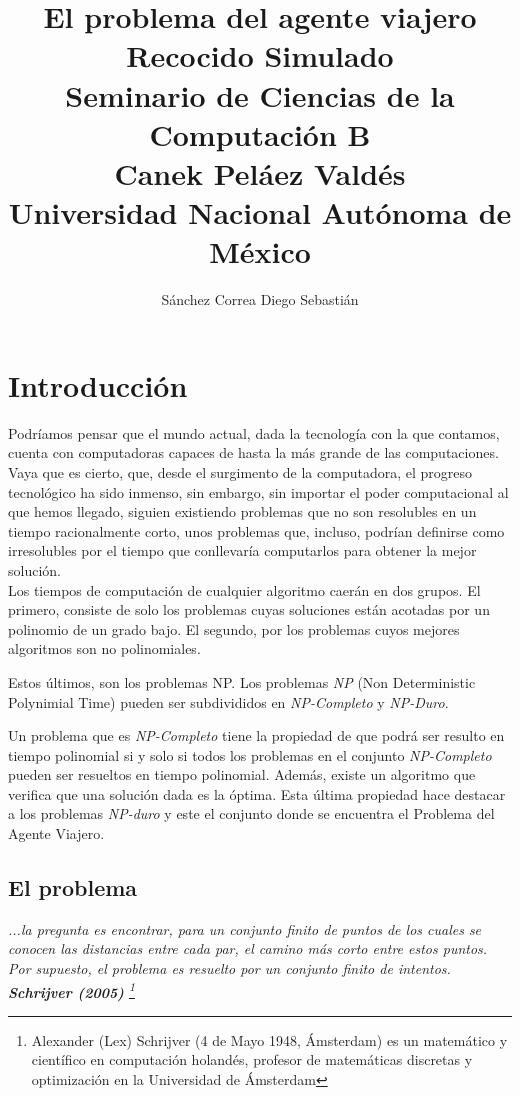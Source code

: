 \documentclass[a4paper]{report}
\title {\textbf {\Large{El problema del agente viajero}}\protect\\
  \large{\textbf{Recocido Simulado}}\protect\\ \vspace{0.4cm}
  \normalsize{\textbf{Seminario de Ciencias de la Computaci\'on B}} \protect\\ \vspace{0.2cm}
  \normalsize{Canek Pel\'aez Vald\'es} \protect\\ \vspace{0.4cm}
  \normalsize{Universidad Nacional Aut\'onoma de M\'exico}}
\date{}
\author{\normalsize Sánchez Correa Diego Sebastián}
\begin{document}
\allowdisplaybreaks
\maketitle
\tableofcontents

\chapter{Introducci\'on}
Podr\'iamos pensar que el mundo actual, dada la tecnolog\'ia con la que contamos,
cuenta con computadoras capaces de hasta la m\'as grande de las computaciones. Vaya que es
cierto, que, desde el surgimento de la computadora, el progreso tecnol\'ogico ha sido inmenso,
sin embargo, sin importar el poder computacional al que hemos llegado, siguien existiendo
problemas que no son resolubles en un tiempo racionalmente corto, unos problemas que, incluso,
podr\'ian definirse como irresolubles por el tiempo que conllevar\'ia computarlos para obtener
la mejor soluci\'on.\\

Los tiempos de computaci\'on de cualquier algoritmo caer\'an en dos grupos.
El primero, consiste de solo los problemas cuyas soluciones est\'an acotadas por un polinomio
de un grado bajo. El segundo, por los problemas cuyos mejores algoritmos son no polinomiales.

Estos \'ultimos, son los problemas NP. Los problemas \textit{NP} (Non Deterministic Polynimial Time)
pueden ser subdivididos en \textit{NP-Completo} y \textit{NP-Duro}.

Un problema que es \textit{NP-Completo} tiene la propiedad de que podr\'a ser resulto en tiempo
polinomial si y solo si todos los problemas en el conjunto \textit{NP-Completo} pueden ser
resueltos en tiempo polinomial. Adem\'as, existe un algoritmo que verifica que una soluci\'on
dada es la \'optima. Esta \'ultima propiedad hace destacar a los problemas \textit{NP-duro} y este
el conjunto donde se encuentra el Problema del Agente Viajero.
\clearpage
\section{El problema}

\begin{center}
  \textit{...la pregunta es encontrar, para un conjunto finito de puntos de los
    cuales se conocen las distancias entre cada par, el camino más corto entre
    estos puntos. Por supuesto, el problema es resuelto por un conjunto finito
    de intentos. \textbf{Schrijver (2005)}
    \footnote{Alexander (Lex) Schrijver (4 de Mayo 1948, \'Amsterdam) es
      un matem\'atico y cient\'ifico en computaci\'on holand\'es,
      profesor de matem\'aticas discretas y optimizaci\'on
      en la Universidad de \'Amsterdam}}
\end{center}
\end{document}

